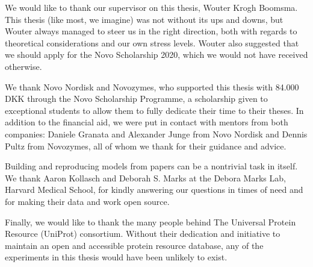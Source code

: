 \begin{acknowledgements}
We would like to thank our supervisor on this thesis, Wouter Krogh Boomsma. This thesis (like most, we imagine) was not without its ups and downs, but Wouter always managed to steer us in the right direction, both with regards to theoretical considerations and our own stress levels. Wouter also suggested that we should apply for the Novo Scholarship 2020, which we would not have received otherwise.

We thank Novo Nordisk and Novozymes, who supported this thesis with 84.000 DKK through the Novo Scholarship Programme, a scholarship given to exceptional students to allow them to fully dedicate their time to their theses. In addition to the financial aid, we were put in contact with mentors from both companies: Daniele Granata and Alexander Junge from Novo Nordisk and Dennis Pultz from Novozymes, all of whom we thank for their guidance and advice.

Building and reproducing models from papers can be a nontrivial task in itself. We thank Aaron Kollasch and Deborah S. Marks at the Debora Marks Lab, Harvard Medical School, for kindly answering our questions in times of need and for making their data and work open source.

Finally, we would like to thank the many people behind The Universal Protein Resource (UniProt) consortium. Without their dedication and initiative to maintain an open and accessible protein resource database, any of the experiments in this thesis would have been unlikely to exist.
\end{acknowledgements}
